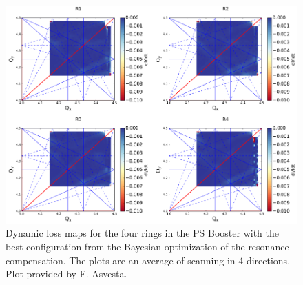 \begin{figure}[H]
    \centering
    \includegraphics[width=\columnwidth]{chapter5/bocomp.png}
    \caption{Dynamic loss maps for the four rings in the PS Booster with the best configuration from the Bayesian optimization of the resonance compensation. The plots are an average of scanning in 4 directions. Plot provided by F. Asvesta.}
    \label{fig:bocomp_psb}
   \vspace{-1.25em}
\end{figure}
